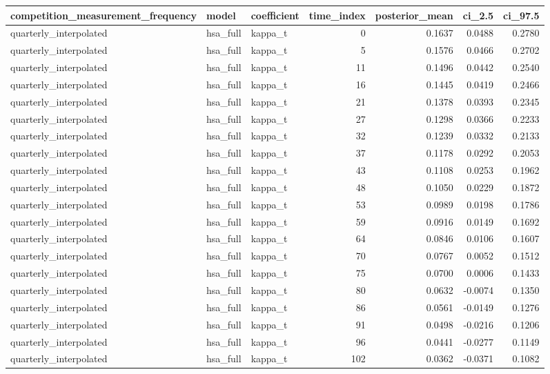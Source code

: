\begin{tabular}{lllrrrr}
\toprule
competition\_measurement\_frequency & model & coefficient & time\_index & posterior\_mean & ci\_2.5 & ci\_97.5 \\
\midrule
quarterly\_interpolated & hsa\_full & kappa\_t & 0 & 0.1637 & 0.0488 & 0.2780 \\
quarterly\_interpolated & hsa\_full & kappa\_t & 5 & 0.1576 & 0.0466 & 0.2702 \\
quarterly\_interpolated & hsa\_full & kappa\_t & 11 & 0.1496 & 0.0442 & 0.2540 \\
quarterly\_interpolated & hsa\_full & kappa\_t & 16 & 0.1445 & 0.0419 & 0.2466 \\
quarterly\_interpolated & hsa\_full & kappa\_t & 21 & 0.1378 & 0.0393 & 0.2345 \\
quarterly\_interpolated & hsa\_full & kappa\_t & 27 & 0.1298 & 0.0366 & 0.2233 \\
quarterly\_interpolated & hsa\_full & kappa\_t & 32 & 0.1239 & 0.0332 & 0.2133 \\
quarterly\_interpolated & hsa\_full & kappa\_t & 37 & 0.1178 & 0.0292 & 0.2053 \\
quarterly\_interpolated & hsa\_full & kappa\_t & 43 & 0.1108 & 0.0253 & 0.1962 \\
quarterly\_interpolated & hsa\_full & kappa\_t & 48 & 0.1050 & 0.0229 & 0.1872 \\
quarterly\_interpolated & hsa\_full & kappa\_t & 53 & 0.0989 & 0.0198 & 0.1786 \\
quarterly\_interpolated & hsa\_full & kappa\_t & 59 & 0.0916 & 0.0149 & 0.1692 \\
quarterly\_interpolated & hsa\_full & kappa\_t & 64 & 0.0846 & 0.0106 & 0.1607 \\
quarterly\_interpolated & hsa\_full & kappa\_t & 70 & 0.0767 & 0.0052 & 0.1512 \\
quarterly\_interpolated & hsa\_full & kappa\_t & 75 & 0.0700 & 0.0006 & 0.1433 \\
quarterly\_interpolated & hsa\_full & kappa\_t & 80 & 0.0632 & -0.0074 & 0.1350 \\
quarterly\_interpolated & hsa\_full & kappa\_t & 86 & 0.0561 & -0.0149 & 0.1276 \\
quarterly\_interpolated & hsa\_full & kappa\_t & 91 & 0.0498 & -0.0216 & 0.1206 \\
quarterly\_interpolated & hsa\_full & kappa\_t & 96 & 0.0441 & -0.0277 & 0.1149 \\
quarterly\_interpolated & hsa\_full & kappa\_t & 102 & 0.0362 & -0.0371 & 0.1082 \\

\end{tabular}
